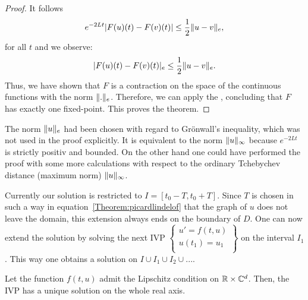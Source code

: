 \begin{proof}
  It follows   
  \begin{gather*}
    e^{-2 L t}|F(u)(t) - F(v)(t)| \le \frac12 \lVert u-v\rVert_e,
  \end{gather*}
  for all $t$ and we observe:
  \begin{gather*}
    |F(u)(t) - F(v)(t)|_e \le \frac12 \lVert u-v\rVert_e.
  \end{gather*}
  Thus, we have shown that $F$ is a contraction on the space of the
  continuous functions with the norm $\lVert.\rVert_e$.  Therefore, we can apply
  the , concluding that $F$ has
  exactly one fixed-point. This proves the theorem.
\end{proof}

\begin{remark}
  The norm $\lVert u\rVert_e$ had been chosen with regard to Grönwall's
  inequality, which was not used in the proof explicitly.  It is
  equivalent to the norm $\lVert u\rVert_\infty$ because $e^{-2 L t}$ is strictly
  positiv and bounded. On the other hand one could have performed the
  proof with some more calculations with respect to the ordinary
  Tchebychev distance (maximum norm) $\lVert u\rVert_\infty$.
\end{remark}

\begin{remark}
  Currently our solution is restricted to $I = [t_0 - T, t_0 + T]$.
  Since $T$ is chosen in such a way in
  equation~\ref{Theorem:picardlindelof} that the graph of $u$ does not
  leave the domain, this extension always ends on the boundary of
  $D$. One can now extend the solution by solving the next IVP
  $\left\{\begin{array}{l}
            u' = f(t,u)\\
            u(t_1) = u_1\\
  \end{array}\right\}$
	on the interval $I_1$. This way one obtains a solution on
 $I \cup I_1 \cup I_2 \cup ...$.
\end{remark}

\begin{corollary}
  Let the function $f(t,u)$ admit the Lipschitz condition on $\mathbb R\times
  \mathbb C^d$. Then, the IVP has a unique solution on the whole real axis.
\end{corollary}

